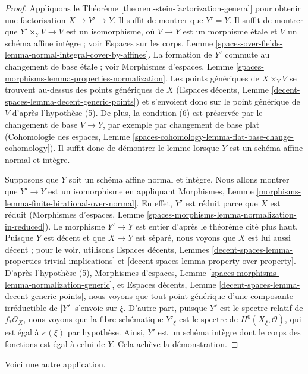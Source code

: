 \begin{proof}
Appliquons le Théorème \ref{theorem-stein-factorization-general} pour obtenir une
factorisation $X \to Y' \to Y$. Il suffit de montrer que $Y' = Y$.
Il suffit de montrer que $Y' \times_Y V \to V$ est un isomorphisme,
où $V \to Y$ est un morphisme étale et $V$ un schéma affine intègre ;
voir Espaces sur les corps, Lemme
\ref{spaces-over-fields-lemma-normal-integral-cover-by-affines}.
La formation de $Y'$ commute au changement de base étale ; voir
Morphismes d'espaces, Lemme
\ref{spaces-morphisms-lemma-properties-normalization}.
Les points génériques de $X \times_Y V$ se trouvent au-dessus des points génériques de $X$
(Espaces décents, Lemme \ref{decent-spaces-lemma-decent-generic-points})
et s'envoient donc sur le point générique de $V$ d'après l'hypothèse (5). De plus, la condition
(6) est préservée par le changement de base $V \to Y$, par exemple par
changement de base plat (Cohomologie des espaces, Lemme
\ref{spaces-cohomology-lemma-flat-base-change-cohomology}).
Il suffit donc de démontrer le lemme lorsque $Y$ est un schéma affine
normal et intègre.

\medskip\noindent
Supposons que $Y$ soit un schéma affine normal et intègre. Nous allons montrer que $Y' \to Y$
est un isomorphisme en appliquant Morphismes, Lemme
\ref{morphisms-lemma-finite-birational-over-normal}.
En effet, $Y'$ est réduit parce que $X$ est réduit (Morphismes d'espaces, Lemme
\ref{spaces-morphisms-lemma-normalization-in-reduced}).
Le morphisme $Y' \to Y$ est entier d'après le théorème cité plus haut.
Puisque $Y$ est décent et que $X \to Y$ est séparé, nous voyons que
$X$ est lui aussi décent ; pour le voir, utilisons
Espaces décents, Lemmes
\ref{decent-spaces-lemma-properties-trivial-implications} et
\ref{decent-spaces-lemma-property-over-property}. D'après l'hypothèse (5),
Morphismes d'espaces, Lemme \ref{spaces-morphisms-lemma-normalization-generic},
et Espaces décents, Lemme \ref{decent-spaces-lemma-decent-generic-points},
nous voyons que tout point générique d'une composante irréductible de $|Y'|$
s'envoie sur $\xi$. D'autre part, puisque $Y'$ est le spectre relatif
de $f_*\mathcal{O}_X$, nous voyons que la fibre schématique
$Y'_\xi$ est le spectre de $H^0(X_\xi, \mathcal{O})$, qui est
égal à $\kappa(\xi)$ par hypothèse. Ainsi, $Y'$ est un schéma
intègre dont le corps des fonctions est égal à celui de $Y$.
Cela achève la démonstration.
\end{proof}

\noindent
Voici une autre application.

